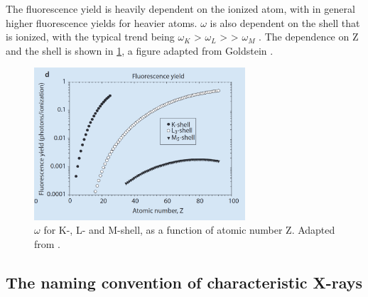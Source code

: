 The fluorescence yield is heavily dependent on the ionized atom, with in general higher fluorescence yields for heavier atoms.
$\omega$ is also dependent on the shell that is ionized, with the typical trend being $\omega_K$ > $\omega_L$ > > $\omega_M$ \cite[p. 267]{goldstein_scanning_2018}.
The dependence on Z and the shell is shown in \cref{fig:theory:fluorescence_yield}, a figure adapted from Goldstein \cite[Fig. 4.3 (d)]{goldstein_scanning_2018}.

\begin{figure}[ht]
    \centering
    \includegraphics[width=0.7\textwidth]{figures/fluorescence_yield_Goldstein_Fig4-3-d.png}
    \caption{
        $\omega$ for K-, L- and M-shell, as a function of atomic number Z.
        Adapted from \cite[Fig. 4.3 (d)]{goldstein_scanning_2018}.
    }
    \label{fig:theory:fluorescence_yield}
\end{figure}








\subsection{The naming convention of characteristic X-rays}
\label{theory:xray_formation:naming}



